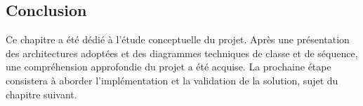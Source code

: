 \subsection*{Conclusion}

Ce chapitre a été dédié à l’étude conceptuelle du projet. Après une présentation des architectures adoptées et des diagrammes techniques de classe et de séquence, une compréhension approfondie du projet a été acquise. La prochaine étape consistera à aborder l’implémentation et la validation de la solution, sujet du chapitre suivant.
\pagebreak